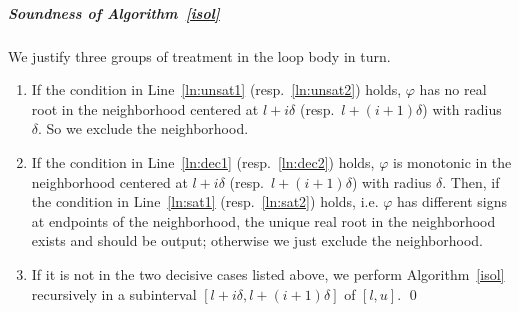 \documentclass[a4paper,UKenglish,cleveref,autoref,thm-restate,authorcolumns]{lipics-v2019}
\newcommand{\I}{\mathcal{I}}
\begin{document}

\subparagraph*{Soundness of Algorithm~\ref{isol}}
We justify three groups of treatment in the loop body in turn.
\begin{enumerate}
	\item If the condition in Line~\ref{ln:unsat1} (resp.~\ref{ln:unsat2}) holds,
		$\varphi$ has no real root in the neighborhood
		centered at $l+i\delta$ (resp.~$l+(i+1)\delta$) with radius $\delta$.
		So we exclude the neighborhood.
	\item If the condition in Line~\ref{ln:dec1} (resp.~\ref{ln:dec2}) holds,
		$\varphi$ is monotonic in the neighborhood
		centered at $l+i\delta$ (resp.~$l+(i+1)\delta$) with radius $\delta$.
		Then, if the condition in Line~\ref{ln:sat1} (resp.~\ref{ln:sat2}) holds,
		i.e. $\varphi$ has different signs at endpoints of the neighborhood,
		the unique real root in the neighborhood exists and should be output;
		otherwise we just exclude the neighborhood.
	\item If it is not in the two decisive cases listed above,
		we perform Algorithm~\ref{isol} recursively
		in a subinterval $[l+i\delta,l+(i+1)\delta]$ of $[l,u]$. \qed
\end{enumerate}
	
\end{document}
